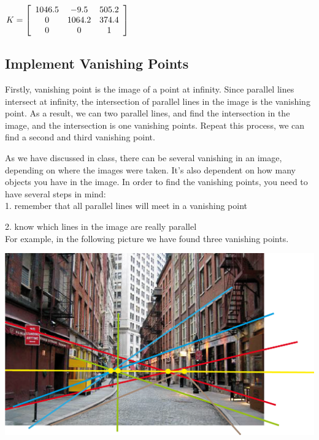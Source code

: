 \documentclass[]{article}
\begin{document}
\centerline {
	$ K =\left[ {\begin{array}{*{20}c}
		1046.5 & -9.5 & 505.2 \\
		0 & 1064.2 & 374.4 \\
		0 & 0 & 1 
		\end{array} } \right] $
}

\vspace{0.5em}


\subsection{Implement Vanishing Points}

Firstly, vanishing point is the image of a point at infinity. Since parallel lines intersect at infinity, the intersection of parallel lines in the image is the vanishing point. As a result, we can two parallel lines, and find the intersection in the image, and the intersection is one vanishing points. Repeat this process, we can find a second and third vanishing point.

As we have discussed in class, there can be several vanishing in an image, depending on where the images were taken. It's also dependent on how many objects you have in the image. In order to find the vanishing points, you need to have several steps in mind: \\

1. remember that all parallel lines will meet in a vanishing point

2. know which lines in the image are really parallel \\ 

For example, in the following picture we have found three vanishing points. 

\vspace{0.5em}

\centerline {
	\includegraphics[scale=0.4]{vanishing}
}
\end{document}
